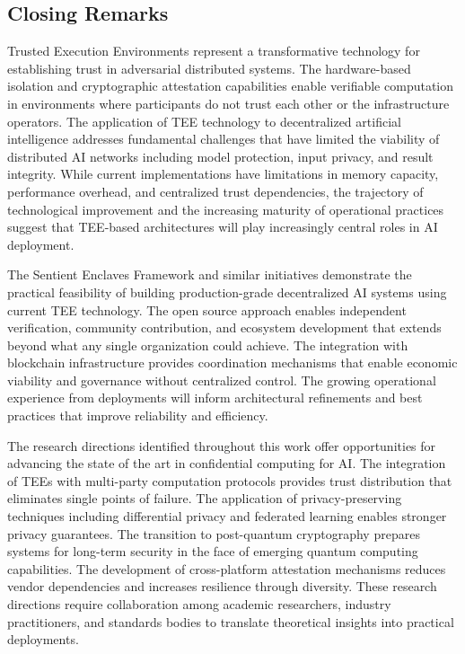 \subsection{Closing Remarks}

Trusted Execution Environments represent a transformative technology for establishing trust in adversarial distributed systems. The hardware-based isolation and cryptographic attestation capabilities enable verifiable computation in environments where participants do not trust each other or the infrastructure operators. The application of TEE technology to decentralized artificial intelligence addresses fundamental challenges that have limited the viability of distributed AI networks including model protection, input privacy, and result integrity. While current implementations have limitations in memory capacity, performance overhead, and centralized trust dependencies, the trajectory of technological improvement and the increasing maturity of operational practices suggest that TEE-based architectures will play increasingly central roles in AI deployment.

The Sentient Enclaves Framework and similar initiatives demonstrate the practical feasibility of building production-grade decentralized AI systems using current TEE technology. The open source approach enables independent verification, community contribution, and ecosystem development that extends beyond what any single organization could achieve. The integration with blockchain infrastructure provides coordination mechanisms that enable economic viability and governance without centralized control. The growing operational experience from deployments will inform architectural refinements and best practices that improve reliability and efficiency.

The research directions identified throughout this work offer opportunities for advancing the state of the art in confidential computing for AI. The integration of TEEs with multi-party computation protocols provides trust distribution that eliminates single points of failure. The application of privacy-preserving techniques including differential privacy and federated learning enables stronger privacy guarantees. The transition to post-quantum cryptography prepares systems for long-term security in the face of emerging quantum computing capabilities. The development of cross-platform attestation mechanisms reduces vendor dependencies and increases resilience through diversity. These research directions require collaboration among academic researchers, industry practitioners, and standards bodies to translate theoretical insights into practical deployments.

